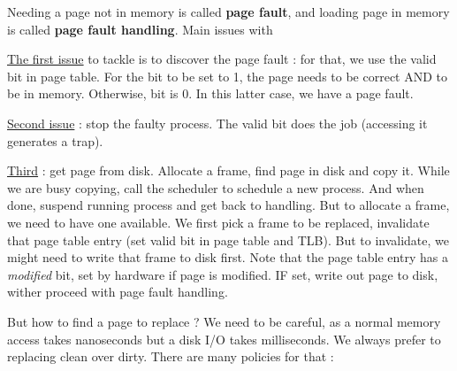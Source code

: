 \documentclass[12pt,a4paper]{article}
\begin{document}
\begin{blackbox}
Needing a page not in memory is called \textbf{page fault}, and loading page in memory is called \textbf{page fault handling}. Main issues with
\end{blackbox}

\uline{The first issue} to tackle is to discover the page fault : for that, we use the valid bit in page table. For the bit to be set to 1, the page needs to be correct AND to be in memory. Otherwise, bit is 0. In this latter case, we have a page fault.

\uline{Second issue} : stop the faulty process. The valid bit does the job (accessing it generates a trap). 

\uline{Third} : get page from disk. Allocate a frame, find page in disk and copy it. While we are busy copying, call the scheduler to schedule a new process. And when done, suspend running process and get back to handling. But to allocate a frame, we need to have one available. We first pick a frame to be replaced, invalidate that page table entry (set valid bit in page table and TLB). But to invalidate, we might need to write that frame to disk first. Note that the page table entry has a \textit{modified} bit, set by hardware if page is modified. IF set, write out page to disk, wither proceed with page fault handling.

But how to find a page to replace ? We need to be careful, as a normal memory access takes nanoseconds but a disk I/O takes milliseconds. We always prefer to replacing clean over dirty. There are many policies for that :
\end{document}
